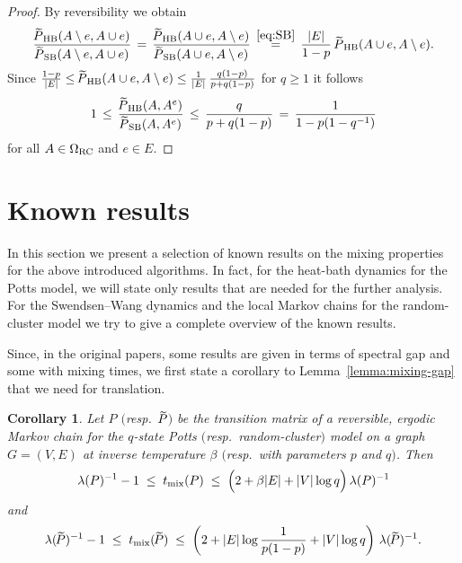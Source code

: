 \documentclass{dis}
\newtheorem{corollary}[theorem]{Corollary}
\theoremstyle{citing}
\begin{document}
\begin{proof}
By reversibility we obtain 
\[
\frac{{{\raisebox{2pt}{ ${\widetilde{{}}}$ }\mkern-14mu P}_{\rm HB}}(A\setminus e,A\cup e)}{{{\raisebox{2pt}{ ${\widetilde{{}}}$ }\mkern-14mu P}_{\rm SB}}(A\setminus e,A\cup e)} 
\,=\, \frac{{{\raisebox{2pt}{ ${\widetilde{{}}}$ }\mkern-14mu P}_{\rm HB}}(A\cup e,A\setminus e)}{{{\raisebox{2pt}{ ${\widetilde{{}}}$ }\mkern-14mu P}_{\rm SB}}(A\cup e,A\setminus e)} 
\,\stackrel{\eqref{eq:SB}}{=}\, 
\frac{{\left\vert {E} \right\vert}}{1-p}\; {{\raisebox{2pt}{ ${\widetilde{{}}}$ }\mkern-14mu P}_{\rm HB}}(A\cup e,A\setminus e).
\]
Since 
$\frac{1-p}{{\left\vert {E} \right\vert}} \le {{\raisebox{2pt}{ ${\widetilde{{}}}$ }\mkern-14mu P}_{\rm HB}}(A\cup e,A\setminus e) 
\le \frac{1}{{\left\vert {E} \right\vert}}\,\frac{q(1-p)}{p+q(1-p)}$ 
for $q\ge1$ it follows 
\begin{equation}\label{eq:proof_lemma:SB-HB}
1 \,\le\, \frac{{{\raisebox{2pt}{ ${\widetilde{{}}}$ }\mkern-14mu P}_{\rm HB}}(A,A^e)}{{{\raisebox{2pt}{ ${\widetilde{{}}}$ }\mkern-14mu P}_{\rm SB}}(A,A^e)} \,\le\, \frac{q}{p+q(1-p)} 
\,=\, \frac{1}{1-p(1-q^{-1})}
\end{equation}
for all $A\in{{\Omega}_{\rm RC}}$ and $e\in E$. 
\end{proof}

\vspace{2mm}

\section{Known results} \label{sec:2_known-results}

In this section we present a selection of known results 
on the mixing properties for the above introduced algorithms. 
In fact, for the heat-bath dynamics for the Potts model, 
we will state only results 
that are needed for the further analysis. 
For the Swendsen--Wang dynamics and the local Markov chains 
for the random-cluster model we try to give a 
complete overview of the known results.

Since, in the original papers, some results are given in terms of 
spectral gap and some with mixing times, we first state a 
corollary to Lemma~\ref{lemma:mixing-gap} that we need for 
translation.

\begin{corollary} \label{coro:mixing-gap}
Let $P$ $($resp.~${\raisebox{2pt}{ ${\widetilde{{}}}$ }\mkern-14mu P}$$)$ be the transition matrix of a reversible, 
ergodic Markov chain for the $q$-state Potts 
$($resp.~random-cluster$)$ model on a graph $G=(V,E)$ at inverse 
temperature $\beta$ $($resp.~with parameters $p$ and $q$$)$. 
Then
\[
\lambda(P)^{-1}-1 \;\le\; t_{\rm mix}(P) 
\;\le\; \Bigl(2 + \beta{\left\vert {E} \right\vert} + {\left\vert {V} \right\vert} \log q\Bigr)\,
			\lambda(P)^{-1} 
\]
and
\[
\lambda({\raisebox{2pt}{ ${\widetilde{{}}}$ }\mkern-14mu P})^{-1}-1 \;\le\; t_{\rm mix}({\raisebox{2pt}{ ${\widetilde{{}}}$ }\mkern-14mu P}) 
\;\le\; \left(2 + {\left\vert {E} \right\vert} \log\frac{1}{p(1-p)} + {\left\vert {V} \right\vert} \log q\right)\,
			\lambda({\raisebox{2pt}{ ${\widetilde{{}}}$ }\mkern-14mu P})^{-1}. 
\]
\end{corollary}
\end{document}
